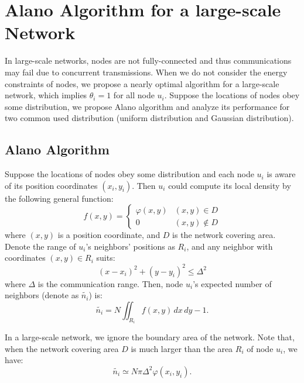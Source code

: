 \section{Alano Algorithm for a large-scale Network}
\label{PCN}


In large-scale networks, nodes are not fully-connected and thus communications may fail due to concurrent transmissions. 
When we do not consider the energy constraints of nodes, we propose a nearly optimal algorithm for a large-scale network, which implies $\theta_i = 1$ for all node $u_i$.
Suppose the locations of nodes obey some distribution, we propose Alano algorithm and analyze its performance for two common used distribution (uniform distribution and Gaussian distribution).

\subsection{Alano Algorithm}
Suppose the locations of nodes obey some distribution and each node $u_i$ is aware of its position coordinates $(x_i, y_i)$.
Then $u_i$ could compute its local density by the following general function: %
$$f(x,y)=
\begin{cases}
\varphi(x,y)& (x,y)\in D\\
0& (x,y)\notin D
\end{cases}$$
where $(x,y)$ is a position coordinate, and $D$ is the network covering area.
Denote the range of $u_i$'s neighbors' positions as $R_i$,  and any neighbor with coordinates $(x,y) \in R_i$ suits:
$$
(x-x_i)^2+(y-y_i)^2 \leq \Delta^2
$$
where $\Delta$ is the communication range. Then, node $u_i$'s expected number of neighbors (denote as $\widetilde{n_i}$) is:
$$
\widetilde{n_i} = N\iint_{R_i} f(x,y)\,dx\,dy - 1.
$$

In a large-scale network, we ignore the boundary area of the network.  %
Note that, when the network covering area $D$ is much larger than the area $R_i$ of node $u_i$, we have:
\begin{equation}
\label{eqnNB}
\widetilde{n_i} \simeq N\pi \Delta^2 \varphi(x_i,y_i).
\end{equation}


